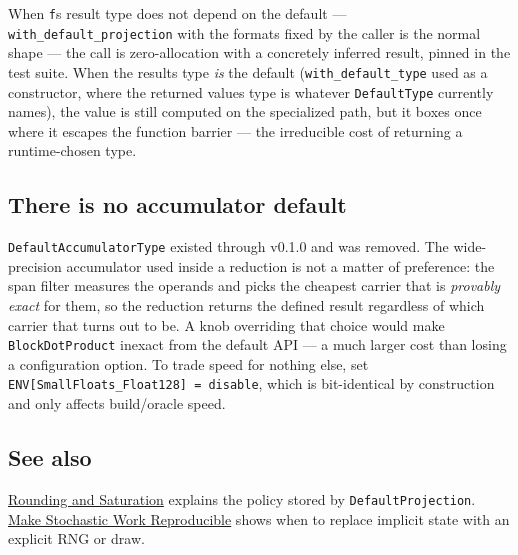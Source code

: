 When \texttt{f}{\textquotesingle}s result type does not depend on the default — \texttt{with\_\allowbreak{}default\_\allowbreak{}projection} with the formats fixed by the caller is the normal shape — the call is zero-allocation with a concretely inferred result, pinned in the test suite. When the result{\textquotesingle}s type \emph{is} the default (\texttt{with\_\allowbreak{}default\_\allowbreak{}type} used as a constructor, where the returned value{\textquotesingle}s type is whatever \texttt{DefaultType} currently names), the value is still computed on the specialized path, but it boxes once where it escapes the function barrier — the irreducible cost of returning a runtime-chosen type.



\subsection{There is no accumulator default}



\label{4054721483846715076}{}


\begin{tcolorbox}[toptitle=-1mm,bottomtitle=1mm,colback=admonition-note!50!white,colframe=admonition-note,title=\textbf{There is no accumulator default}]
\texttt{DefaultAccumulatorType} existed through v0.1.0 and was removed. The wide-precision accumulator used inside a reduction is not a matter of preference: the span filter measures the operands and picks the cheapest carrier that is \emph{provably exact} for them, so the reduction returns the defined result regardless of which carrier that turns out to be. A knob overriding that choice would make \texttt{BlockDotProduct} inexact from the default API — a much larger cost than losing a configuration option. To trade speed for nothing else, set \texttt{ENV[{\textquotedbl}SmallFloats\_\allowbreak{}Float128{\textquotedbl}] = {\textquotedbl}disable{\textquotedbl}}, which is bit-identical by construction and only affects build/oracle speed.

\end{tcolorbox}


\subsection{See also}



\label{292862844209942199-dup5}{}


\href{concept\_\allowbreak{}rounding\_\allowbreak{}saturation.md}{Rounding and Saturation} explains the policy stored by \texttt{DefaultProjection}. \href{workflow\_\allowbreak{}stochastic.md}{Make Stochastic Work Reproducible} shows when to replace implicit state with an explicit RNG or draw.



